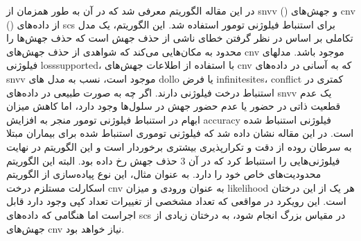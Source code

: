 در این مقاله الگوریتم  معرفی شد که در آن به طور همزمان از \gls{snvv} () و جهش‌های \gls{cnv} () از داده‌های \gls{scs} برای استنباط فیلوژنی تومور استفاده شد. این الگوریتم، یک مدل تکاملی بر اساس در نظر گرفتن خطای ناشی از حذف جهش است که حذف جهش‌ها را محدود به مکان‌هایی می‌کند که شواهدی از حذف جهش‌های \gls{cnv} موجود باشد. مدلهای فیلوژنی \gls{losssupported}،  با استفاده از اطلاعات جهش‌های \gls{cnv} که به آسانی در داده‌های \gls{snvv} موجود است، نسب به مدل های \gls{dollo} یا فرض \gls{infinitesites}، \gls{conflict} کمتری در استنباط درخت فیلوژنی دارند. اگر چه به صورت طبیعی در داده‌های \gls{snvv} یک عدم قطعیت ذاتی در حضور یا عدم حضور جهش در سلول‌ها وجود دارد، اما کاهش میزان ابهام در استنباط فیلوژنی تومور منجر به افزایش \gls{accuracy} فیلوژنی استنباط شده است. در این مقاله نشان داده شد که فیلوژنی توموری استنباط شده برای بیماران مبتلا به سرطان روده از دقت و تکرارپذیری بیشتری برخوردار است و این الگوریتم در نهایت فیلوژنی‌هایی را استنباط کرد که در آن 3 حذف جهش رخ داده بود. البته این الگوریتم محدودیت‌های خاص خود را دارد. به عنوان مثال، این نوع پیاده‌سازی از الگوریتم اسکارلت مستلزم درخت \gls{cnv} به عنوان ورودی و میزان \gls{likelihood} هر یک از این درختان است. این رویکرد در مواقعی که تعداد مشخصی از تغییرات تعداد کپی وجود دارد قابل اجراست اما هنگامی که داده‌های \gls{scs} در مقیاس بزرگ انجام شود، به درختان زیادی از جهش‌های \gls{cnv} نیاز خواهد بود. 








%
%
%
%
%
%
%

